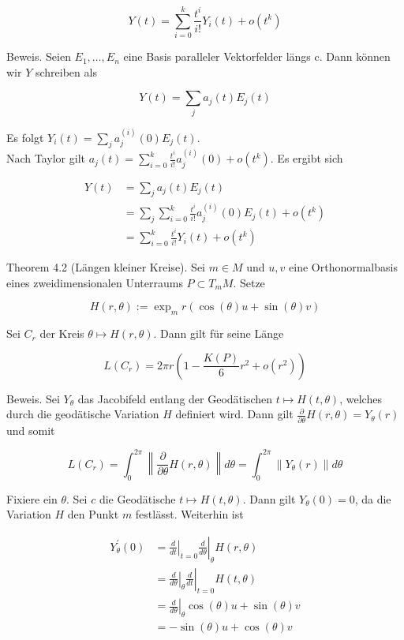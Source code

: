 \documentclass[10pt, letterpaper]{article}
\begin{document}
$$
Y(t)=\sum_{i=0}^{k} \frac{t^{i}}{i!} Y_{i}(t)+o\left(t^{k}\right)
$$

Beweis. Seien $E_{1}, \ldots, E_{n}$ eine Basis paralleler Vektorfelder längs c. Dann können wir $Y$ schreiben als

$$
Y(t)=\sum_{j} a_{j}(t) E_{j}(t)
$$

Es folgt $Y_{i}(t)=\sum_{j} a_{j}^{(i)}(0) E_{j}(t)$.\\
Nach Taylor gilt $a_{j}(t)=\sum_{i=0}^{k} \frac{t^{i}}{i!} a_{j}^{(i)}(0)+o\left(t^{k}\right)$. Es ergibt sich

$$
\begin{aligned}
Y(t) & =\sum_{j} a_{j}(t) E_{j}(t) \\
& =\sum_{j} \sum_{i=0}^{k} \frac{t^{i}}{i!} a_{j}^{(i)}(0) E_{j}(t)+o\left(t^{k}\right) \\
& =\sum_{i=0}^{k} \frac{t^{i}}{i!} Y_{i}(t)+o\left(t^{k}\right)
\end{aligned}
$$

Theorem 4.2 (Längen kleiner Kreise). Sei $m \in M$ und $u, v$ eine Orthonormalbasis eines zweidimensionalen Unterraums $P \subset T_{m} M$. Setze

$$
H(r, \theta):=\exp _{m} r(\cos (\theta) u+\sin (\theta) v)
$$

Sei $C_{r}$ der Kreis $\theta \mapsto H(r, \theta)$. Dann gilt für seine Länge

$$
L\left(C_{r}\right)=2 \pi r\left(1-\frac{K(P)}{6} r^{2}+o\left(r^{2}\right)\right)
$$

Beweis. Sei $Y_{\theta}$ das Jacobifeld entlang der Geodätischen $t \mapsto H(t, \theta)$, welches durch die geodätische Variation $H$ definiert wird. Dann gilt $\frac{\partial}{\partial \theta} H(r, \theta)=Y_{\theta}(r)$ und somit

$$
L\left(C_{r}\right)=\int_{0}^{2 \pi}\left\|\frac{\partial}{\partial \theta} H(r, \theta)\right\| d \theta=\int_{0}^{2 \pi}\left\|Y_{\theta}(r)\right\| d \theta
$$

Fixiere ein $\theta$. Sei $c$ die Geodätische $t \mapsto H(t, \theta)$. Dann gilt $Y_{\theta}(0)=0$, da die Variation $H$ den Punkt $m$ festlässt. Weiterhin ist

$$
\begin{aligned}
Y_{\theta}^{\prime}(0) & =\left.\left.\frac{d}{d t}\right|_{t=0} \frac{d}{d \theta}\right|_{\theta} H(r, \theta) \\
& =\left.\left.\frac{d}{d \theta}\right|_{\theta} \frac{d}{d t}\right|_{t=0} H(t, \theta) \\
& =\left.\frac{d}{d \theta}\right|_{\theta} \cos (\theta) u+\sin (\theta) v \\
& =-\sin (\theta) u+\cos (\theta) v
\end{aligned}
$$
\end{document}
